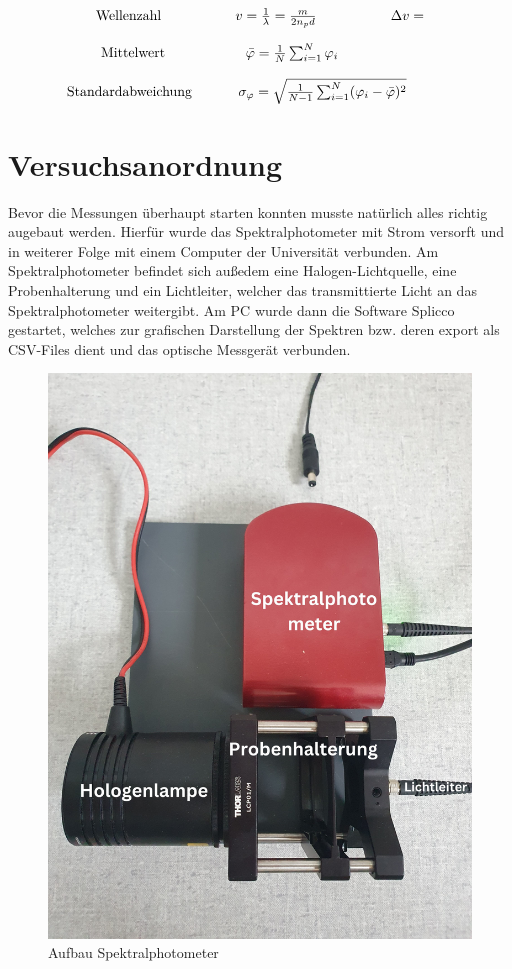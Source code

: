 \documentclass[12pt,a4paper,twoside]{article}
\begin{document}
\begin{equation}
    \label{eq:Wellenzahl}
    \centerline{Wellenzahl \\ $v=\frac{1}{\lambda}=\frac{m}{2n_{p}d}$ \\ $\Delta v=$}
\end{equation}

\begin{equation}
    \label{eq:Mittelwert}
    \centerline{Mittelwert \\ $\bar{\varphi} = \frac{1}{N} \sum_{i = 1}^{N} \varphi_i $ \\}
\end{equation}

\begin{equation}
    \label{eq:Standardabweichung}
    \centerline{Standardabweichung \\ $\sigma_{\varphi} = \sqrt{\frac{1}{N-1} \sum_{i = 1}^{N} (\varphi_i - \bar{\varphi})^2}$ \\}
\end{equation}

    

\section{Versuchsanordnung} %

Bevor die Messungen überhaupt starten konnten musste natürlich alles richtig augebaut werden. Hierfür wurde das Spektralphotometer mit Strom versorft und in weiterer Folge mit einem Computer der Universität verbunden.
Am Spektralphotometer befindet sich außedem eine Halogen-Lichtquelle, eine Probenhalterung und ein Lichtleiter, welcher das transmittierte Licht an das Spektralphotometer weitergibt.
Am PC wurde dann die Software Splicco gestartet, welches zur grafischen Darstellung der Spektren bzw. deren export als CSV-Files dient und das optische Messgerät verbunden. 

\begin{figure}[H]
    \centering
    \includegraphics[width=0.6\linewidth]{nudes/Spektralphotometer.jpg}
    \caption{Aufbau Spektralphotometer}
    \label{fig:VersuchsaufbauIRL}
\end{figure}
\end{document}
